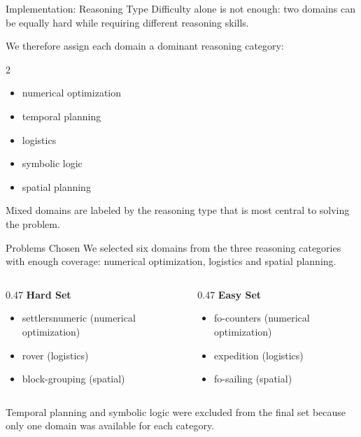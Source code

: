 \documentclass{beamer}
\begin{document}
\begin{frame}{Implementation: Reasoning Type}\footnotesize
    Difficulty alone is not enough: two domains can be equally hard while requiring different reasoning skills.

    \vspace{0.25cm}
    We therefore assign each domain a dominant reasoning category:
    \begin{multicols}{2}
    \begin{itemize}
        \item numerical optimization
        \item temporal planning
        \item logistics
        \item symbolic logic
        \item spatial planning
    \end{itemize}
    \end{multicols}

    Mixed domains are labeled by the reasoning type that is most central to solving the problem.
\end{frame}

\begin{frame}{Problems Chosen}\footnotesize
    We selected six domains from the three reasoning categories with enough coverage: numerical optimization, logistics and spatial planning.

    \vspace{0.25cm}
    \begin{columns}
        \begin{column}{0.47\textwidth}
            \centering \textbf{Hard Set}
            \begin{itemize}
                \item settlersnumeric (numerical optimization)
                \item rover (logistics)
                \item block-grouping (spatial)
            \end{itemize}
        \end{column}
        
        \begin{column}{0.47\textwidth}
            \centering \textbf{Easy Set}
            \begin{itemize}
                \item fo-counters (numerical optimization)
                \item expedition (logistics)
                \item fo-sailing (spatial)
            \end{itemize}
        \end{column}
    \end{columns}

    \vspace{0.25cm}
    Temporal planning and symbolic logic were excluded from the final set because only one domain was available for each category.
\end{frame}
\end{document}
